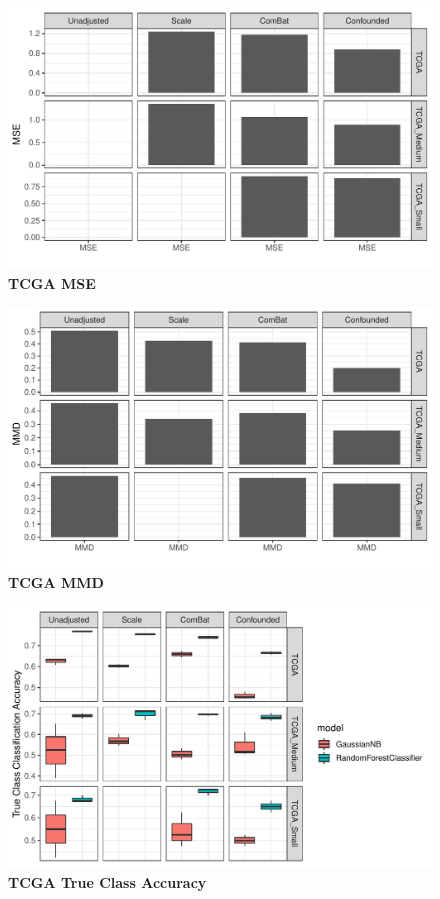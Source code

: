 \documentclass{article}
\begin{document}
\begin{figure}
	\centering
	\includegraphics[width=\columnwidth]{figures/supplement/tcga_mse.pdf}
	\caption{\textbf{TCGA MSE}
	}
	\label{fig:mse}
\end{figure}
\begin{figure}
	\centering
	\includegraphics[width=\columnwidth]{figures/supplement/tcga_mmd.pdf}
	\caption{\textbf{TCGA MMD}
	}
	\label{fig:mmd}
\end{figure}
\begin{figure}
	\centering
	\includegraphics[width=\columnwidth]{figures/supplement/tcga_true_class_accuracy.pdf}
	\caption{\textbf{TCGA True Class Accuracy}
	}
	\label{fig:true_class}
\end{figure}
\end{document}
